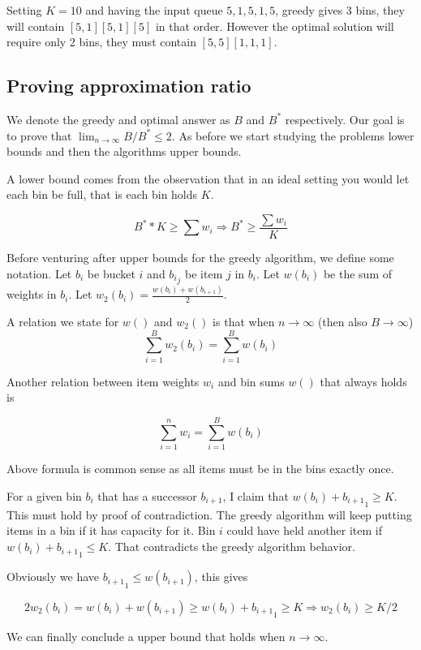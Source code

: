 \documentclass[a4paper,11pt]{article}
\begin{document}
Setting $K = 10$ and having the input queue $5, 1, 5, 1, 5$, greedy gives
3 bins, they will contain $[5, 1] [5,1] [5]$ in that order. However the optimal
solution will require only 2 bins, they must contain $[5, 5] [1, 1, 1]$.

\subsection{Proving approximation ratio}

We denote the greedy and optimal answer as $B$ and $B^*$ respectively.
Our goal is to prove that $\lim_{n \to \infty} B/B^* \leq 2$. As before we
start studying the problems lower bounds and then the algorithms upper bounds.

A lower bound comes from the observation that in an ideal setting you would
let each bin be full, that is each bin holds $K$.

\[
 B^* * K \geq \sum w_i \Rightarrow B^* \geq \frac{\sum w_i}{K}
\]

Before venturing after upper bounds for the greedy algorithm, we define some
notation.
Let ${b_i}$ be bucket $i$ and ${b_i}_j$ be item $j$ in ${b_i}$.
Let $w({b_i})$ be the sum of weights in ${b_i}$.
Let $w_2({b_i}) = \frac{w({b_i}) + w(b_{i+1})}{2}$.

A relation we state for $w()$ and $w_2()$ is that when $n \to \infty$ (then
also $B \to \infty$)
\[
 \sum_{i=1}^{B} w_2({b_i}) = \sum_{i=1}^{B} w({b_i})
\]

Another relation between item weights $w_i$ and bin sums $w()$ that always holds
is

\[
 \sum_{i=1}^{n} w_i = \sum_{i=1}^{B} w({b_i})
\]

Above formula is common sense as all items must be in the bins exactly once.

For a given bin ${b_i}$ that has a successor $b_{i+1}$, I claim that
$w({b_i}) + {b_{i+1}}_1 \geq K$. This must hold by proof of contradiction.
The greedy algorithm will keep putting items in a bin if it has capacity for it.
Bin $i$ could have
held another item if $w({b_i}) + {b_{i+1}}_1 \leq K$. That contradicts the greedy
algorithm behavior.

Obviously we have ${b_{i+1}}_1 \leq w(b_{i+1})$, this gives

\[
 2w_2({b_i}) = w({b_i}) + w(b_{i+1}) \geq w({b_i}) + {b_{i+1}}_1 \geq K
 \Rightarrow w_2({b_i}) \geq K/2
\]

We can finally conclude a upper bound that holds when $n \to \infty$.
\end{document}
